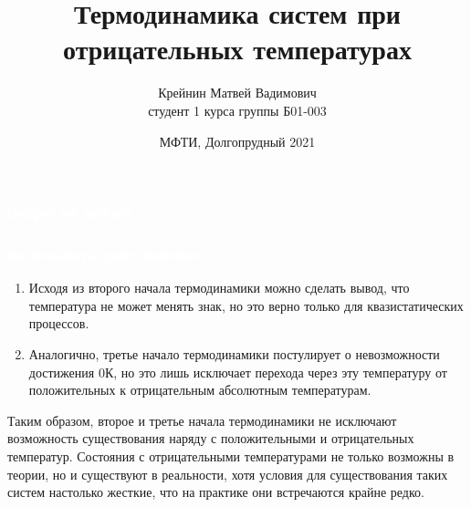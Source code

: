 \documentclass[aspectratio=169]{beamer}
\title{Термодинамика систем при отрицательных температурах}
\date{\small{МФТИ, Долгопрудный 2021}}
\author{\small{Крейнин Матвей Вадимович \\ студент 1 курса группы Б01-003}}
\begin{document}
\begin{frame}
\frametitle{\textcolor{white}{Вопрос по выбору}} 
	\titlepage
\end{frame}

\begin{frame}
\frametitle{\textcolor{white}{Возможность существования}} 

\begin{enumerate}
\item<1-> Исходя из второго начала термодинамики можно сделать вывод, что температура не может менять знак, но это верно только для квазистатических процессов.
\item<1->  Аналогично, третье начало термодинамики постулирует о невозможности достижения 0К, но это лишь исключает перехода через эту температуру от положительных к отрицательным абсолютным температурам.
\end{enumerate}
Таким образом, второе и третье начала термодинамики не исключают возможность существования наряду с положительными и отрицательных температур. Состояния с отрицательными температурами не только возможны в теории, но и существуют в реальности, хотя условия для существования таких систем настолько жесткие, что на практике они встречаются крайне редко.
\end{frame}
\end{document}
